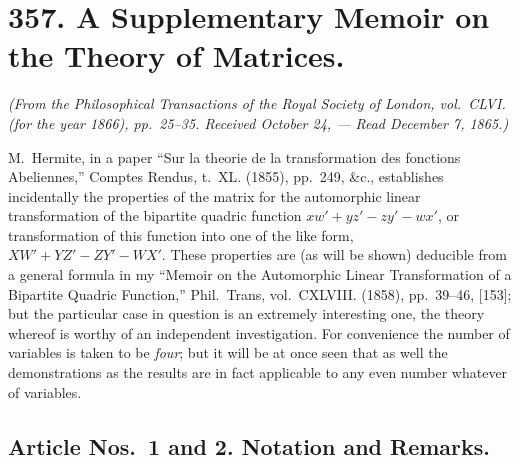 \documentclass[11pt,a4paper]{article}
\theoremstyle{plain}
\begin{document}
\section*{357. A Supplementary Memoir on the Theory of Matrices.\quad [357]}
\label{sec:357}

\begin{flushright}
\textit{(From the Philosophical Transactions of the Royal Society of London, vol.~CLVI. (for the year 1866), pp.~25--35. Received October 24, --- Read December 7, 1865.)}
\end{flushright}

M.~Hermite, in a paper ``Sur la theorie de la transformation des fonctions Abeliennes,'' Comptes Rendus, t.~XL. (1855), pp.~249, \&c., establishes incidentally the properties of the matrix for the automorphic linear transformation of the bipartite quadric function $xw' + yz' - zy' - wx'$, or transformation of this function into one of the like form, $XW' + YZ' - ZY' - WX'$. These properties are (as will be shown) deducible from a general formula in my ``Memoir on the Automorphic Linear Transformation of a Bipartite Quadric Function,'' Phil.\ Trans, vol.~CXLVIII. (1858), pp.~39--46, [153]; but the particular case in question is an extremely interesting one, the theory whereof is worthy of an independent investigation. For convenience the number of variables is taken to be \textit{four}; but it will be at once seen that as well the demonstrations as the results are in fact applicable to any even number whatever of variables.

\subsection*{Article Nos.~1 and 2. Notation and Remarks.}
\end{document}
